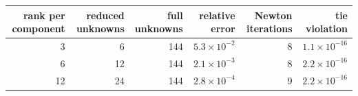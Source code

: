 \begin{tabular}{rrrrrr}
\toprule
rank per component & reduced unknowns & full unknowns & relative error & Newton iterations & tie violation \\
\midrule
3 & 6 & 144 & $5.3\times10^{-2}$ & 8 & $1.1\times10^{-16}$ \\
6 & 12 & 144 & $2.1\times10^{-3}$ & 8 & $2.2\times10^{-16}$ \\
12 & 24 & 144 & $2.8\times10^{-4}$ & 9 & $2.2\times10^{-16}$ \\
\bottomrule
\end{tabular}
